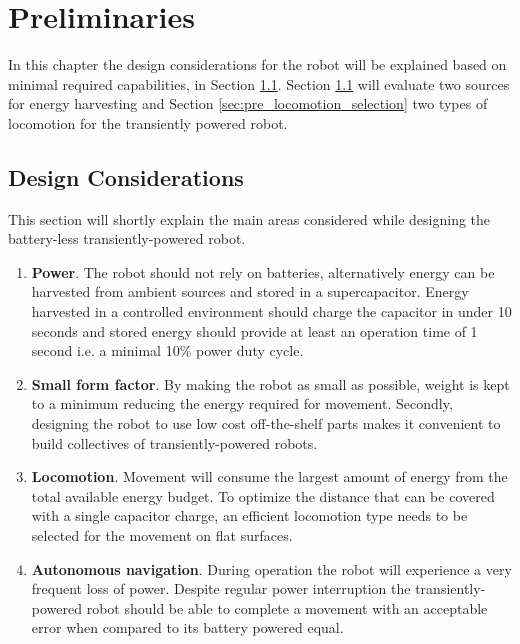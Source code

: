 \chapter{Preliminaries}
\label{chp:preliminaries}

In this chapter the design considerations for the robot will be explained based on minimal required capabilities, in Section \ref{sec:pre_design_considerations}.
Section \ref{sec:pre_design_considerations} will evaluate two sources for energy harvesting and Section \ref{sec:pre_locomotion_selection} two types of locomotion for the transiently powered robot.

\section{Design Considerations}
\label{sec:pre_design_considerations}

This section will shortly explain the main areas considered while designing the battery-less transiently-powered robot.

\begin{enumerate}
	\item \textbf{Power}. 
	The robot should not rely on batteries, alternatively energy can be harvested from ambient sources and stored in a supercapacitor. 
	Energy harvested in a controlled environment should charge the capacitor in under 10 seconds and stored energy should provide at least an operation time of 1 second i.e. a minimal 10\% power duty cycle.
	
	\item \textbf{Small form factor}. 
	By making the robot as small as possible, weight is kept to a minimum reducing the energy required for movement.
	Secondly, designing the robot to use low cost off-the-shelf parts makes it convenient to build collectives of transiently-powered robots.
	
	\item \textbf{Locomotion}.
	Movement will consume the largest amount of energy from the total available energy budget.
	To optimize the distance that can be covered with a single capacitor charge, an efficient locomotion type needs to be selected for the movement on flat surfaces.
	
	\item \textbf{Autonomous navigation}.
	During operation the robot will experience a very frequent loss of power. 
	Despite regular power interruption the transiently-powered robot should be able to complete a movement with an acceptable error when compared to its battery powered equal.
\end{enumerate}

